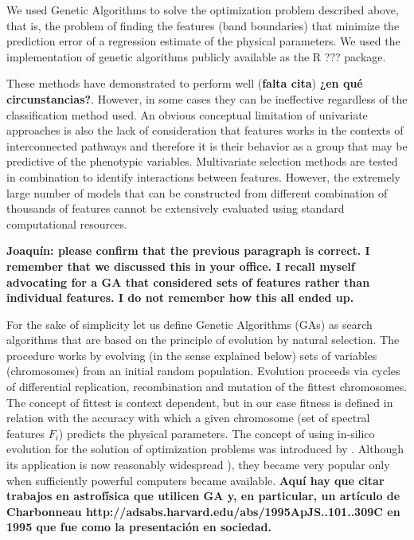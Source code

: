 We used Genetic Algorithms to solve the optimization problem described
above, that is, the problem of finding the features (band boundaries)
that minimize the prediction error of a regression estimate of the
physical parameters. We used the implementation of genetic algorithms
publicly available as the R \citep{R2013} ???  package.

These methods have demonstrated to perform well ({\bf falta cita})
{\bf ¿en qué circunstancias?}. However, in some cases they can be
ineffective regardless of the classification method used. An obvious
conceptual limitation of univariate approaches is also the lack of
consideration that features works in the contexts of interconnected
pathways and therefore it is their behavior as a group that may be
predictive of the phenotypic variables. Multivariate selection methods
are tested in combination to identify interactions between
features. However, the extremely large number of models that can be
constructed from different combination of thousands of features cannot
be extensively evaluated using standard computational resources.

{\bf Joaquín: please confirm that the previous paragraph is correct. I
remember that we discussed this in your office. I recall myself
advocating for a GA that considered sets of features rather than
individual features. I do not remember how this all ended up. }

For the sake of simplicity let us define Genetic Algorithms (GAs) as
search algorithms that are based on the principle of evolution by
natural selection. The procedure works by evolving (in the sense
explained below) sets of variables (chromosomes) from an initial
random population. Evolution proceeds via cycles of differential
replication, recombination and mutation of the fittest
chromosomes. The concept of fittest is context dependent, but in our
case fitness is defined in relation with the accuracy with which a
given chromosome (set of spectral features ${F_i}$) predicts the
physical parameters. The concept of using in-silico evolution for the
solution of optimization problems was introduced
by \cite{holland1975adaptation}. Although its application is now
reasonably widespread \citep[see e.g. ]{goldberg1989genetic}), they
became very popular only when sufficiently powerful computers became
available. {\bf Aquí hay que citar trabajos en astrofísica que
utilicen GA y, en particular, un artículo de Charbonneau
http://adsabs.harvard.edu/abs/1995ApJS..101..309C en 1995 que fue como
la presentación en sociedad.}

